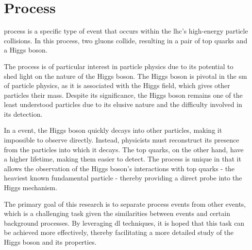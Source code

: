 \section{\tth Process}

\tth process is a specific type of event that occurs within the \gls{lhc}'s high-energy
particle collisions. In this process, two gluons collide, resulting in a pair of top quarks and a Higgs boson.

The \tth process is of particular interest in particle physics due to its potential to shed light on the nature of the
Higgs boson. The Higgs boson is pivotal in the \gls{sm} of particle physics, as it is associated with the Higgs
field, which gives other particles their mass. Despite its significance, the Higgs boson remains one of the least
understood particles due to its elusive nature and the difficulty involved in its detection.

In a \tth event, the Higgs boson quickly decays into other particles, making it impossible to observe directly. Instead,
physicists must reconstruct its presence from the particles into which it decays. The top quarks, on the other hand,
have a higher lifetime, making them easier to detect. The \tth process is unique in that it allows the observation of the
Higgs boson's interactions with top quarks - the heaviest known fundamental particle - thereby providing a direct probe
into the Higgs mechanism.

The primary goal of this research is to separate \tth process events from other events, which is a challenging task given
the similarities between \tth events and certain background processes. By leveraging \gls{dl} techniques, it is
hoped that this task can be achieved more effectively, thereby facilitating a more detailed study of the Higgs boson and
its properties.

